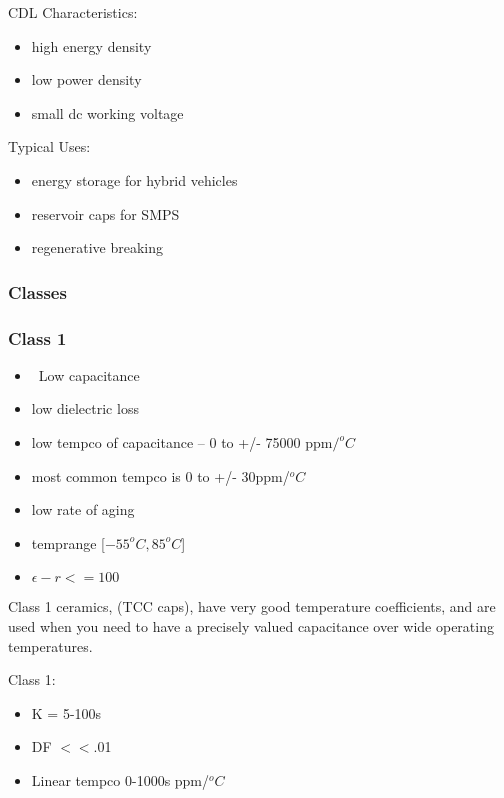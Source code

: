         CDL Characteristics:
        \begin{itemize}
            \item high energy density
            \item low power density
            \item small dc working voltage
        \end{itemize}

        Typical Uses:
        \begin{itemize}
            \item energy storage for hybrid vehicles
            \item reservoir caps for SMPS
            \item regenerative breaking
        \end{itemize}
        \cite{capRev}

    \subsubsection{Classes}
        \subsubsection{Class 1}
            \begin{itemize}
                \item ~Low capacitance
                \item low dielectric loss
                \item low tempco of capacitance -- 0 to +/- 75000 ppm$/^oC$
                \item most common tempco is 0 to +/- 30ppm/$^oC$
                \item low rate of aging
                \item temprange [$-55^oC,85^oC$]
                \item $\epsilon -r <= 100$
            \end{itemize} \cite[Ch 3 Sec VI]{cerMaterials}

            Class 1 ceramics, (TCC caps), have very good temperature coefficients, and are used when you need to have a precisely valued capacitance over wide operating temperatures.  \cite{atCer_tempco}

            Class 1:
            \begin{itemize}
                \item K = 5-100s
                \item DF $<<$.01
                \item Linear tempco 0-1000s ppm/$^oC$ \cite{hist_cerFilt}
            \end{itemize}

